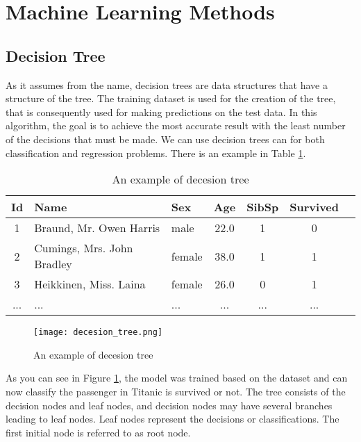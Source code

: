 \section{Machine Learning Methods}

\subsection{Decision Tree}
\label{ssec:decision-tree}

As it assumes from the name, decision trees are data structures that have a structure of the tree. The training dataset is used for the creation of the tree, that is consequently used for making predictions on the test data. In this algorithm, the goal is to achieve the most accurate result with the least number of the decisions that must be made. We can use decision trees can for both classification and regression problems. There is an example in Table \ref{table:decision-tree}.

\begin{table}[h]
\caption{An example of decesion tree}
\centering
\label{table:decision-tree}
\begin{tabular}{c l l c c c c}
\hline
Id & Name                       & Sex    & Age  & SibSp & Survived \\	
\hline
1  & Braund, Mr. Owen Harris    & male   & 22.0	& 1     & 0	\\
2  & Cumings, Mrs. John Bradley & female & 38.0	& 1     & 1	\\
3  & Heikkinen, Miss. Laina	    & female & 26.0	& 0     & 1 \\
...& ...                        & ...    & ...  & ...   & ... \\ 
\hline 
\end{tabular}
\end{table}

\begin{figure}[htbp!] 
\centering    
\texttt{[image: decesion\_tree.png]}
\caption{An example of decesion tree \cite{wikidecesiontree}}
\label{fig:decision-tree}
\end{figure}

As you can see in Figure \ref{fig:decision-tree}, the model was trained based on the dataset and can now classify the passenger in Titanic is survived or not. The tree consists of the decision nodes and leaf nodes, and decision nodes may have several branches leading to leaf nodes. Leaf nodes represent the decisions or classifications. The first initial node is referred to as root node.

